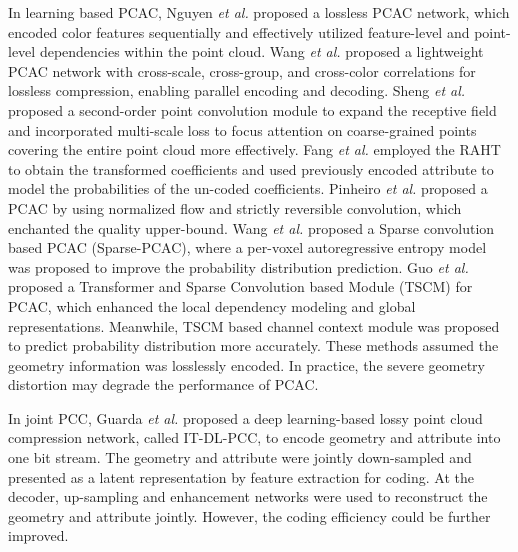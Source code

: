 In learning based PCAC, Nguyen \textit{et al.} \cite{nguyen2023lossless} proposed a lossless PCAC network, which encoded color features sequentially and effectively utilized feature-level and point-level dependencies within the point cloud. Wang \textit{et al.} \cite{wang2023lossless} proposed a lightweight PCAC network with cross-scale, cross-group, and cross-color correlations for lossless compression, enabling parallel encoding and decoding. Sheng \textit{et al.} \cite{7} proposed a second-order point convolution module to expand the receptive field and incorporated multi-scale loss to focus attention on coarse-grained points covering the entire point cloud more effectively. Fang \textit{et al.} \cite{fang20223dac} employed the RAHT to obtain the transformed coefficients and used previously encoded attribute to model the probabilities of the un-coded coefficients. Pinheiro \textit{et al.} \cite{17} proposed a PCAC by using normalized flow and strictly reversible convolution, which enchanted the quality upper-bound. Wang \textit{et al.} \cite{8} proposed a Sparse convolution based PCAC (Sparse-PCAC), where a per-voxel autoregressive entropy model was proposed to improve the probability distribution prediction. Guo \textit{et al.} \cite{10693649} proposed a Transformer and Sparse Convolution based Module (TSCM) for PCAC, which enhanced the local dependency modeling and global representations. Meanwhile, TSCM based channel context module was proposed to predict probability distribution more accurately. These methods assumed the geometry information {was} losslessly encoded. In practice, the severe geometry distortion may degrade the performance of PCAC.

In joint PCC, Guarda \textit{et al.} \cite{guarda2023deep} proposed a deep learning-based lossy point cloud compression network, called IT-DL-PCC, to encode geometry and attribute into one bit stream. The geometry and attribute were jointly down-sampled and presented as a latent representation by feature extraction for coding. At the decoder, up-sampling and enhancement networks were used to reconstruct the geometry and attribute jointly. However, the coding efficiency could be further improved.